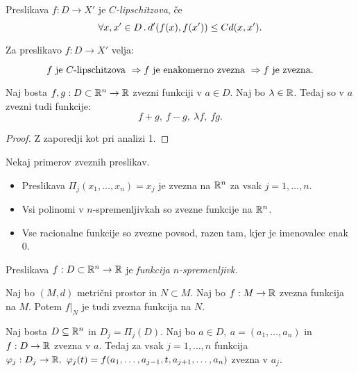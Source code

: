 \begin{definicija}
    Preslikava $f: D \to X'$ je \emph{$C$-lipschitzova}, če
    $$\forall x, x' \in D \,.\, d'(f(x), f(x')) \leq Cd(x, x').$$
\end{definicija}

\begin{trditev}
    Za preslikavo $f: D \to X'$ velja:

    $$f \text{ je $C$-lipschitzova } \Rightarrow f \text{ je enakomerno zvezna } \Rightarrow f \text{ je zvezna}.$$
\end{trditev}

\begin{trditev}
    Naj bosta $f, g: D \subset \mathbb{R}^n \to \mathbb{R}$ zvezni funkciji v $a \in D$. Naj bo $\lambda \in \mathbb{R}$. Tedaj so v $a$ zvezni tudi funkcije:
    $$f+g, \ f-g, \ \lambda f, \ fg.$$
\end{trditev}

\begin{proof}
    Z zaporedji kot pri analizi 1.
\end{proof}

\begin{zgled}
    Nekaj primerov zveznih preslikav.
    \begin{itemize}
        \item Preslikava $\Pi_j(x_1, \ldots, x_n) = x_j$ je zvezna na $\mathbb{R}^n$ za vsak $j = 1, \ldots, n$.
        \item Vsi polinomi v $n$-spremenljivkah so zvezne funkcije na $\mathbb{R}^n$.
        \item Vse racionalne funkcije so zvezne povsod, razen tam, kjer je imenovalec enak $0$.
    \end{itemize}
\end{zgled}

\begin{definicija}
    Preslikava $f: D \subset \mathbb{R}^n \to \mathbb{R}$ je \emph{funkcija $n$-spremenljivk.}
\end{definicija}

\begin{opomba}
    Naj bo $(M, d)$ metrični prostor in $N \subset M$. Naj bo $f: M \to \mathbb{R}$ zvezna funkcija na $M$. Potem $f|_N$ je tudi zvezna funkcija na $N$.
\end{opomba}

\begin{trditev}
    Naj bosta $D \subseteq \mathbb{R}^n$ in $D_j = \Pi_j(D)$. Naj bo $a \in D, \ a =(a_1, \ldots, a_n)$ in $f: D \to \mathbb{R}$ zvezna v $a$. Tedaj za vsak $j = 1, \ldots, n$ funkcija $\varphi_j: D_j \to \RR, \ \varphi_j(t) = f(a_1, \ldots, a_{j-1}, t, a_{j+1}, \ldots, a_n)$ zvezna v $a_j$.
\end{trditev}

